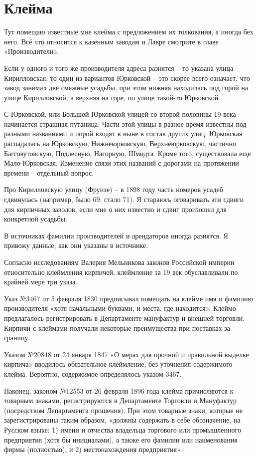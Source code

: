 \chapter{Клейма}

Тут помещаю известные мне клейма с предложением их толкования, а иногда без него. Всё что относится к казенным заводам и Лавре смотрите в главе «Производители».

Если у одного и того же производителя адреса разнятся – то указана улица Кирилловская, то один из вариантов Юрковской – это скорее всего означает, что завод занимал две смежные усадьбы, при этом нижняя находилась под горой на улице Кирилловской, а верхняя на горе, по улице такой-то Юрковской. 

С Юрковской, или Большой Юрковской улицей со второй половины 19 века начинается страшная путаница. Части этой улицы в разное время известны под разными названиями и порой входят в ныне в состав других улиц. Юрковская распадалась на Юрковскую, Нижнеюрковскую, Верхнеюрковскую, частично Багговутовскую, Подлесную, Нагорную, Шмидта. Кроме того, существовала еще Мало-Юрковская. Изменение связи этих названий с дорогами на протяжении времени – отдельный вопрос.

Про Кирилловскую улицу (Фрунзе) – в 1898 году часть номеров усадеб сдвинулась (например, было 69, стало 71). Я стараюсь оговаривать эти сдвиги для кирпичных заводов, если мне о них известно и сдвиг произошел для конкретной усадьбы.

В источниках фамилии производителей и арендаторов иногда разнятся. Я привожу данные, как они указаны в источнике.

Согласно исследованиям Валерия Мельникова законов Российской империи относительно клеймления кирпичей, клеймление за 19 век обуславливали по крайней мере три указа. 

Указ №3467 от 5 февраля 1830 предписывал помещать на клейме имя и фамилию производителя «хотя начальными буквами, и места, где находится». Клеймо предлагалось регистрировать в Департаменте мануфактур и внешней торговли. Кирпичи с клеймами получали некоторые преимущества при поставках за границу. 

Указом №20848 от 24 января 1847 «О мерах для прочной и правильной выделке кирпича» вводилось обязательное клеймление, без уточнения содержимого клейма. Вероятно, содержимое определялось указом 3467.

Наконец, законом №12553 от 26 февраля 1896 года клейма причисляются к товарным знаками, регистрируются в Департаменте Торговли и Мануфактур (посредством Департамента прошения). При этом товарные знаки, которые не зарегистрированы таким образом, «должны содержать в себе обозначение, на Русском языке: 1) имени и отчества владельца торгового или промышленного предприятия (хотя бы инициалами), а также его фамилии или наименования фирмы (полностью), и 2) местонахождения предприятия». 

